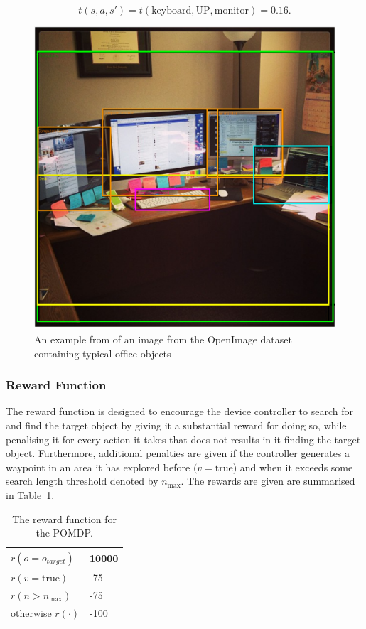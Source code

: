 \documentclass[runningheads]{llncs}
\begin{document}
\begin{equation}
  t(s, a, s') = t(\textrm{keyboard}, \textrm{UP}, \textrm{monitor}) = 0.16.
\end{equation}

\begin{figure}
  \centering
  \includegraphics[width=0.5\columnwidth]{figures/desk_example.png}
  \caption{An example from of an image from the OpenImage dataset~\cite{openimages} containing typical office objects}\label{fig:openimage}
\end{figure}

\subsubsection{Reward Function}

The reward function is designed to encourage the device controller to search for and find the target object by giving it a substantial reward for doing so, while penalising it for every action it takes that does not results in it finding the target object.
Furthermore, additional penalties are given if the controller generates a waypoint in an area it has explored before $(v = \textrm{true}$) and when it exceeds some search length threshold denoted by $n_{\max}$.
The rewards are given are summarised in Table~\ref{tab:rewards}.

\begin{table}[h]
  \centering
  \caption{The reward function for the POMDP. }\label{tab:rewards}
  \begin{tabular}{p{3cm}p{1cm}}
    \toprule
    $r(o = o_{target})$ & 10000 \\ \midrule
    $r(v = \textrm{true})$  & -75 \\ \midrule
    $r(n > n_{\max})$ & -75 \\ \midrule
    otherwise $r(\cdot)$ & -100  \\ \midrule
    \bottomrule
  \end{tabular}
\end{table}
\end{document}
